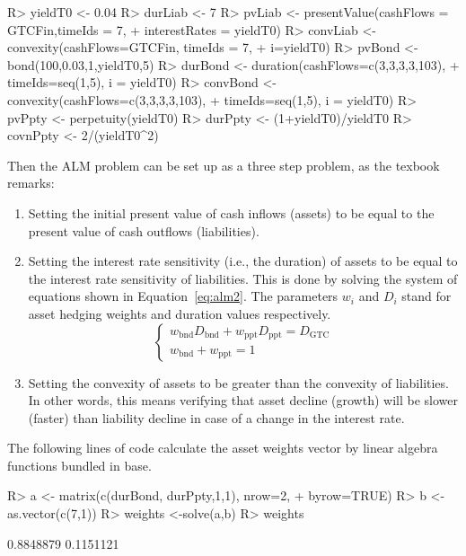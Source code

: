 \documentclass[nojss]{jss}
\begin{document}
\begin{Schunk}
\begin{Sinput}
R> yieldT0 <- 0.04
R> durLiab <- 7
R> pvLiab <- presentValue(cashFlows = GTCFin,timeIds = 7,
+  		interestRates = yieldT0)
R> convLiab <- convexity(cashFlows=GTCFin, timeIds = 7, 
+  		i=yieldT0)
R> pvBond <- bond(100,0.03,1,yieldT0,5)
R> durBond <- duration(cashFlows=c(3,3,3,3,103), 
+  		timeIds=seq(1,5), i = yieldT0)
R> convBond <- convexity(cashFlows=c(3,3,3,3,103), 
+  		timeIds=seq(1,5), i = yieldT0)
R> pvPpty <- perpetuity(yieldT0)
R> durPpty <- (1+yieldT0)/yieldT0
R> covnPpty <- 2/(yieldT0^2)
\end{Sinput}
\end{Schunk}

Then the ALM problem can be set up as a three step problem, as the \cite{mathFinAct}
texbook remarks:
\begin{enumerate}
  \item Setting the initial present value of cash inflows (assets) to be equal
  to the present value of cash outflows (liabilities). 
  \item Setting the interest rate sensitivity (i.e., the duration) of assets to
  be equal to the interest rate sensitivity of liabilities. This is done by solving
  the system of equations shown in Equation~\ref{eq:alm2}. The parameters $w_i$ and $D_i$
 stand for asset hedging weights and duration values
  respectively.
  \begin{equation}
  \left\{ \begin{array}{l}
    {w_{\text{bnd}}}{D_{\text{bnd}}} + {w_{\text{ppt}}}{D_{\text{ppt}}} = D_{\text{GTC}}\\
    w_{\text{bnd}} + w_{\text{ppt}} = 1
    \end{array} \right.
  \label{eq:alm2}
\end{equation}
 \item Setting the convexity of assets to be greater than the convexity  of liabilities. In other words, this means verifying that asset decline
 (growth) will be slower (faster) than liability decline in case of a change in the 
 interest rate.
\end{enumerate}

The following lines of code calculate the asset weights vector by linear algebra
functions bundled in  base.

\begin{Schunk}
\begin{Sinput}
R> a <- matrix(c(durBond, durPpty,1,1), nrow=2, 
+  		byrow=TRUE)
R> b <- as.vector(c(7,1))
R> weights <-solve(a,b)
R> weights
\end{Sinput}
\begin{Soutput}
[1] 0.8848879 0.1151121
\end{Soutput}
\end{Schunk}
\end{document}
